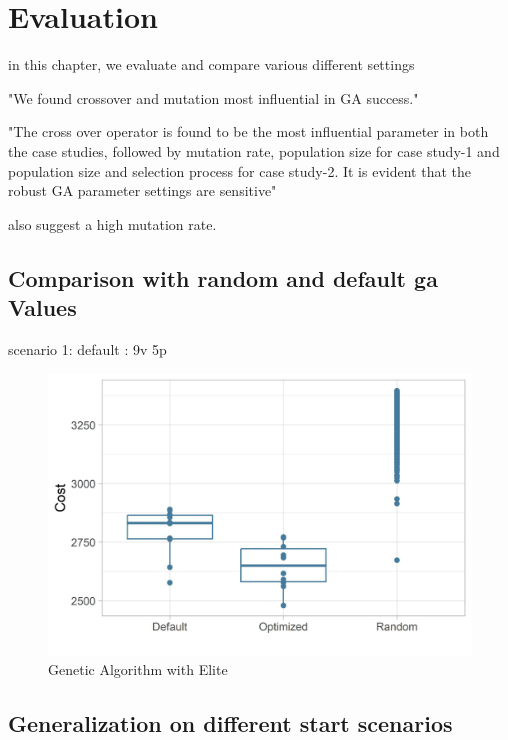 \chapter{Evaluation}
\label{chap:evaluation}
in this chapter, we evaluate and compare various different settings

"We found crossover and mutation most influential in GA success."\cite{mills_determining_2015}

"The cross over operator is found to be the most influential parameter in both the case studies, followed by mutation rate, population size for case study-1 and population size and selection process for case study-2. It is evident that the robust GA parameter settings are sensitive"\cite{majumdar_genetic_2015}

\cite{boyabatli_parameter_2004} also suggest a high mutation rate.

\section{Comparison with random and default ga Values}
scenario 1: default : 9v 5p

\begin{figure}[ht] 
	\label{figure:sim_1_comparison}
	\includegraphics[width=1\linewidth]{simulations/evaluation/plots/sim_1_comparison}
	\caption{Genetic Algorithm with Elite}
\end{figure}

\section{Generalization on different start scenarios}

